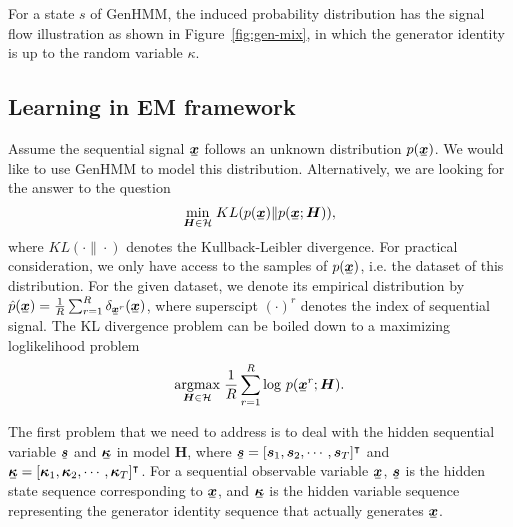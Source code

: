 \documentclass[letterpaper]{article} %
\newcommand{\ubar}[1]{\mkern2mu\underline{\mkern-2mu #1\mkern-2mu}\mkern2mu}
\newcommand{\ubm}[1]{\ubar{\bm{#1}}}
\newcommand{\ubmr}[2]{\ubar{\bm{#1}}^{#2}}
\begin{document}
For a state $s$ of GenHMM, the induced probability distribution has the signal flow illustration as shown in Figure~\ref{fig:gen-mix}, in which the generator identity is up to the random variable $\kappa$.

\subsection{Learning in EM framework}

Assume the sequential signal $\ubm{x}$ follows an unknown distribution $p(\ubm{x})$. We would like to use GenHMM to model this distribution. Alternatively, we are looking for the answer to the question
\begin{equation}
  \umin{\bm{H}\in \Hh} KL({p}(\ubm{x})\| p(\ubm{x};\bm{H})),
\end{equation}
where $KL(\cdot\|\cdot)$ denotes the Kullback-Leibler divergence. For practical consideration, we only have access to the samples of $p(\ubm{x})$, i.e. the dataset of this distribution. For the given dataset, we denote its empirical distribution by $\hat{p}(\ubm{x}) = \frac{1}{R}\sum_{r=1}^{R} \delta_{\ubmr{x}{r}}(\ubm{x})$, where superscipt $(\cdot)^{r}$ denotes the index of sequential signal. 
The KL divergence problem can be boiled down to a maximizing loglikelihood problem
\begin{equation}\label{eq:ml-of-hmm}
  \uargmax{\bm{H} \in \Hh} \frac{1}{R}\sum_{r=1}^{R}\log\,p(\ubmr{x}{r}; \bm{H}).
\end{equation}

The first problem that we need to address is to deal with the hidden sequential variable $\ubm{s}$ and $\ubm{\kappa}$  in model $\bm{H}$, where $\ubm{s}=[ \bm{s}_1, \bm{s}_2, \cdots, \bm{s}_T ]^{\intercal}$ and $\ubm{\kappa} = [\bm{\kappa}_1, \bm{\kappa}_2, \cdots, \bm{\kappa}_T]^{\intercal}$. For a sequential observable variable $\ubm{x}$, $\ubm{s}$ is the hidden state sequence corresponding to $\ubm{x}$, and $\ubm{\kappa}$ is the hidden variable sequence representing the generator identity sequence that actually generates $\ubm{x}$.
\end{document}
